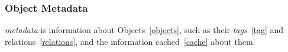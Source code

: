 \subsubsection{Object Metadata}
\label{metadata}

\emph{metadata} is information about Objects~\ref{objects}, such as their \emph{tags}~\ref{tag} and relations~\ref{relations}, and the information cached~\ref{cache} about them. 
